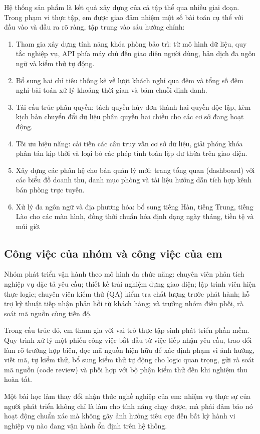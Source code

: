 Hệ thống sản phẩm là kết quả xây dựng của cả tập thể qua nhiều giai đoạn. Trong phạm vi thực tập, em được giao đảm nhiệm một số bài toán cụ thể với đầu vào và đầu ra rõ ràng, tập trung vào sáu hướng chính:

\begin{enumerate}[leftmargin=1.2cm, itemsep=2pt, topsep=3pt]
\item Tham gia xây dựng tính năng khóa phòng bảo trì: từ mô hình dữ liệu, quy tắc nghiệp vụ, API phía máy chủ đến giao diện người dùng, bản dịch đa ngôn ngữ và kiểm thử tự động.
\item Bổ sung hai chỉ tiêu thống kê về lượt khách nghỉ qua đêm và tổng số đêm nghỉ-bài toán xử lý khoảng thời gian và băm chuỗi định danh.
\item Tái cấu trúc phân quyền: tách quyền hủy đơn thành hai quyền độc lập, kèm kịch bản chuyển đổi dữ liệu phân quyền hai chiều cho các cơ sở đang hoạt động.
\item Tối ưu hiệu năng: cải tiến các câu truy vấn cơ sở dữ liệu, giải phóng khóa phân tán kịp thời và loại bỏ các phép tính toán lặp dư thừa trên giao diện.
\item Xây dựng các phân hệ cho bản quản lý mới: trang tổng quan (dashboard) với các biểu đồ doanh thu, danh mục phòng và tài liệu hướng dẫn tích hợp kênh bán phòng trực tuyến.
\item Xử lý đa ngôn ngữ và địa phương hóa: bổ sung tiếng Hàn, tiếng Trung, tiếng Lào cho các màn hình, đồng thời chuẩn hóa định dạng ngày tháng, tiền tệ và múi giờ.
\end{enumerate}

\subsection{Công việc của nhóm và công việc của em}

Nhóm phát triển vận hành theo mô hình đa chức năng: chuyên viên phân tích nghiệp vụ đặc tả yêu cầu; thiết kế trải nghiệm dựng giao diện; lập trình viên hiện thực logic; chuyên viên kiểm thử (QA) kiểm tra chất lượng trước phát hành; hỗ trợ kỹ thuật tiếp nhận phản hồi từ khách hàng; và trưởng nhóm điều phối, rà soát mã nguồn cùng tiến độ.

Trong cấu trúc đó, em tham gia với vai trò thực tập sinh phát triển phần mềm. Quy trình xử lý một phiếu công việc bắt đầu từ việc tiếp nhận yêu cầu, trao đổi làm rõ trường hợp biên, đọc mã nguồn hiện hữu để xác định phạm vi ảnh hưởng, viết mã, tự kiểm thử, bổ sung kiểm thử tự động cho logic quan trọng, gửi rà soát mã nguồn (code review) và phối hợp với bộ phận kiểm thử đến khi nghiệm thu hoàn tất.

Một bài học làm thay đổi nhận thức nghề nghiệp của em: nhiệm vụ thực sự của người phát triển không chỉ là làm cho tính năng chạy được, mà phải đảm bảo nó hoạt động chuẩn xác mà không gây ảnh hưởng tiêu cực đến bất kỳ hành vi nghiệp vụ nào đang vận hành ổn định trên hệ thống.

